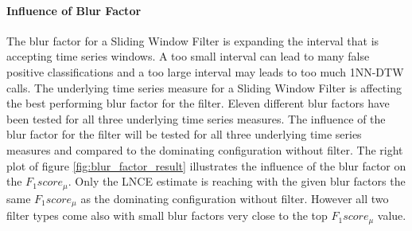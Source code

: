 \paragraph{Influence of Blur Factor} \label{influence_of_blur_factor}
The blur factor for a Sliding Window Filter is expanding the interval that is accepting time series windows. A too small
interval can lead to many false positive classifications and a too large interval may leads to too much 1NN-DTW calls.
The underlying time series measure for a Sliding Window Filter is affecting the best performing blur factor for the
filter. Eleven different blur factors have been tested for all three underlying time series measures. The influence of
the blur factor for the filter will be tested for all three underlying time series measures and compared to the
dominating configuration without filter. The right plot of figure \ref{fig:blur_factor_result} illustrates the influence
of the blur factor on the $F_{1}score_{\mu}$. Only the LNCE estimate is reaching with the given blur factors the same
$F_{1}score_{\mu}$ as the dominating configuration without filter. However all two filter types come also with small
blur factors very close to the top $F_{1}score_{\mu}$ value.

